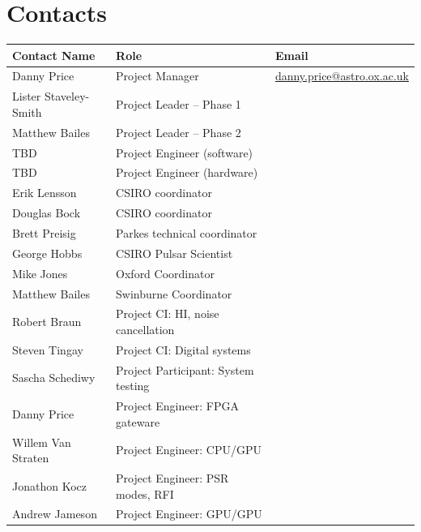 \documentclass[letterpaper,10pt,english]{sphinxmanual}
\begin{document}
\chapter{Contacts}
\label{contacts::doc}\label{contacts:contacts}
\begin{tabulary}{\linewidth}{|L|L|L|}
\hline
\textbf{
Contact Name
} & \textbf{
Role
} & \textbf{
Email
}\\\hline

Danny Price
 & 
Project Manager
 & 
\href{mailto:danny.price@astro.ox.ac.uk}{danny.price@astro.ox.ac.uk}
\\\hline

Lister Staveley-Smith
 & 
Project Leader – Phase 1
 & \\\hline

Matthew Bailes
 & 
Project Leader – Phase 2
 & \\\hline

TBD
 & 
Project Engineer (software)
 & \\\hline

TBD
 & 
Project Engineer (hardware)
 & \\\hline

Erik Lensson
 & 
CSIRO coordinator
 & \\\hline

Douglas Bock
 & 
CSIRO coordinator
 & \\\hline

Brett Preisig
 & 
Parkes technical coordinator
 & \\\hline

George Hobbs
 & 
CSIRO Pulsar Scientist
 & \\\hline

Mike Jones
 & 
Oxford Coordinator
 & \\\hline

Matthew Bailes
 & 
Swinburne Coordinator
 & \\\hline

Robert Braun
 & 
Project CI: HI, noise cancellation
 & \\\hline

Steven Tingay
 & 
Project CI: Digital systems
 & \\\hline

Sascha Schediwy
 & 
Project Participant: System testing
 & \\\hline

Danny Price
 & 
Project Engineer: FPGA gateware
 & \\\hline

Willem Van Straten
 & 
Project Engineer: CPU/GPU
 & \\\hline

Jonathon Kocz
 & 
Project Engineer: PSR modes, RFI
 & \\\hline

Andrew Jameson
 & 
Project Engineer: GPU/GPU
 & \\\hline
\end{tabulary}
\end{document}
